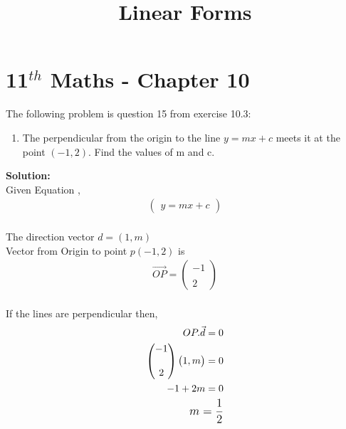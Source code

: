 \documentclass[12pt]{article}
\newcommand{\solution}{\noindent \textbf{Solution: }}
\newcommand{\myvec}[1]{\ensuremath{\begin{pmatrix}#1\end{pmatrix}}}
\begin{document}
\graphicspath{{./Documents}{./figs}}
\begin{center}
  \title{\textbf{Linear Forms}}
  \date{\vspace{-5ex}}
  \maketitle
\end{center}
\setcounter{page}{1}
\section*{11$ ^{th} $ Maths - Chapter 10}
The following problem is question 15 from exercise 10.3:
\begin{enumerate}
\item The perpendicular from the origin to the line $y=mx+c$ meets it at the point $(-1,2)$. Find the values of m and c.
\end{enumerate}
\solution \\
    Given Equation ,
    \begin{align} 
    \myvec{ y=mx+c }
     \label{eq:1}
    \end{align}\\
    The direction vector $d=(1,m)$ \\
    Vector from Origin to point $p(-1,2)$ is
    \begin{align}
    \Vec{OP}=
  \begin{pmatrix}
             -1\\ \\ 2 \nonumber
 \end{pmatrix}
 \end{align} \\
 If the lines are perpendicular then,\\

 \begin{align}
        \Vec{OP.d=0 } \\
  \begin{pmatrix}
    -1\\ \\  2
  \end{pmatrix}
  \begin{pmatrix}
    1 , m
  \end{pmatrix}
  = 0  \nonumber\\
 \textbf{$-1 + 2m =0$}\\
\large{\textbf{$m =\frac{1}{2}$}}\\
\end{align}
     
\end{document}
